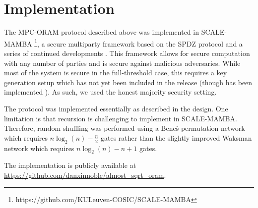 \section{Implementation}

The MPC-ORAM protocol described above was implemented in 
SCALE-MAMBA \footnote{https://github.com/KULeuven-COSIC/SCALE-MAMBA}, 
a secure multiparty framework based on the SPDZ protocol 
\cite{damgaard2012multiparty}
and a series of continued developments \cite{damgaard2013practical,
keller2018overdrive, aly2019zaphod}.
This framework allows for secure computation with any number of parties
and is secure against malicious adversaries.
While most of the system is secure in the full-threshold case,
this requires a key generation setup which has not yet been 
included in the release (though has been implemented \cite{rotaruactively}). 
As such, we used the honest majority security setting.

The protocol was implemented essentially as described in the design.
One limitation is that recursion is challenging to implement in
SCALE-MAMBA. Therefore, random shuffling was performed using
a Bene\v{s} permutation network \cite{benevs1964permutation}  
which requires $n \log_2(n) - \frac{n}{2}$ gates
rather than the slightly improved Waksman network
\cite{waksman1968permutation} 
which requires $n \log_2(n) - n + 1$ gates.

The implementation is publicly available at 
\url{https://github.com/danxinnoble/almost_sqrt_oram}.
